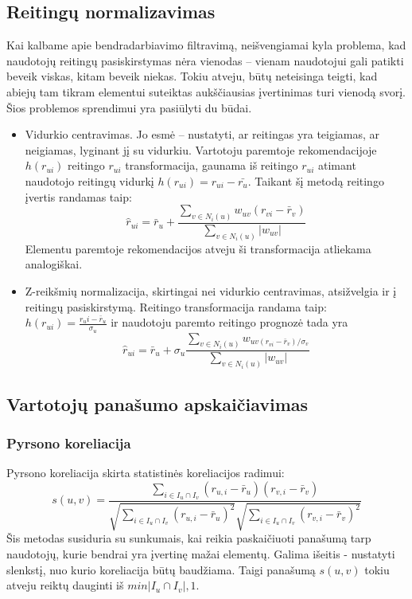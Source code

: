 \documentclass{VUMIFInfMagistrinis}
\begin{document}
\subsection{Reitingų normalizavimas}
Kai kalbame apie bendradarbiavimo filtravimą, neišvengiamai kyla problema, kad naudotojų reitingų pasiskirstymas nėra vienodas – vienam naudotojui gali patikti beveik viskas, kitam beveik niekas. Tokiu atveju, būtų neteisinga teigti, kad abiejų tam tikram elementui suteiktas aukščiausias įvertinimas turi vienodą svorį.  Šios problemos sprendimui yra pasiūlyti du būdai.
\begin{itemize}
	\item Vidurkio centravimas. Jo esmė – nustatyti, ar reitingas yra teigiamas, ar neigiamas, lyginant jį su vidurkiu. Vartotoju paremtoje rekomendacijoje $h(r_{ui})$ reitingo $r_{ui}$ transformacija, gaunama iš reitingo $r_{ui}$ atimant naudotojo reitingų vidurkį $h(r_{ui}) = r_{ui} - \bar{r_u}$. Taikant šį metodą reitingo įvertis randamas taip: 
	\begin{equation}
	\hat{r}_{ui} = \bar{r}_u + \frac{\sum\limits_{v \in N_i(u)} w_{uv}(r_{vi} - \bar{r}_v)}{\sum\limits_{v \in N_i(u)} |w_{uv}|}
	\end{equation}
	Elementu paremtoje rekomendacijos atveju ši transformacija atliekama analogiškai.
\item	Z-reikšmių normalizacija, skirtingai nei vidurkio centravimas, atsižvelgia ir į reitingų pasiskirstymą. Reitingo transformacija randama taip: $h(r_{ui}) = \frac{r_ui-\bar{r}_u}{\sigma_u}$ ir naudotoju paremto reitingo prognozė tada yra 
\begin{equation}
\hat{r}_{ui} = \bar{r}_u + \sigma_u \frac{\sum\limits_{v \in N_i(u)} w_{uv (r_{vi} - \bar{r}_v)/ \sigma_v}}{\sum\limits_{v \in N_i(u)} |w_{uv}|}
\end{equation}
				
\end{itemize}
\subsection{Vartotojų panašumo apskaičiavimas}
\subsubsection{Pyrsono koreliacija}

	Pyrsono koreliacija skirta statistinės koreliacijos radimui:
	\begin{equation}
	s(u,v) = \frac{\sum \limits_{i\in I_u \cap I_v }(r_{u,i}-\bar{r}_u)(r_{v,i}-\bar{r}_v)}{\sqrt{\sum\limits_{i \in I_u \cap I_v }(r_{u,i} - \bar{r}_u)^2}\sqrt{\sum\limits_{i \in I_u \cap I_v }(r_{v,i} - \bar{r}_v)^2}}
	\end{equation}
	Šis metodas susiduria su sunkumais, kai reikia paskaičiuoti panašumą tarp naudotojų, kurie bendrai yra įvertinę mažai elementų. Galima išeitis - nustatyti slenkstį, nuo kurio koreliacija būtų baudžiama. Taigi panašumą $s(u,v)$ tokiu atveju reiktų dauginti iš $min{|I_u \cap I_v|, 1}$.
\end{document}
